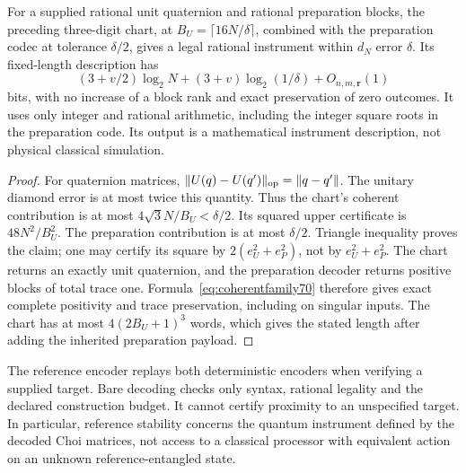 \begin{corollary}\label{cor:qubitcodec70}
For a supplied rational unit quaternion and rational preparation blocks,
the preceding three-digit chart, at $B_U=\lceil16N/\delta\rceil$, combined
with the preparation codec at tolerance $\delta/2$, gives a legal rational
instrument within $d_N$ error $\delta$. Its fixed-length description has
\[
 (3+v/2)\log_2N+(3+v)\log_2(1/\delta)+O_{n,m,\boldsymbol r}(1)
\]
bits, with no increase of a block rank and exact preservation of zero
outcomes. It uses only integer and rational arithmetic, including the
integer square roots in the preparation code. Its output is a mathematical
instrument description, not physical classical simulation.
\end{corollary}
\begin{proof}
For quaternion matrices,
$\|U(q)-U(q')\|_{\rm op}=\|q-q'\|$. The unitary diamond error is
at most twice this quantity. Thus the chart's coherent contribution
is at most $4\sqrt3 N/B_U<\delta/2$. Its squared upper certificate is
$48N^2/B_U^2$. The preparation contribution is at most $\delta/2$.
Triangle inequality proves the claim; one may certify its square by
$2(e_U^2+e_P^2)$, not by $e_U^2+e_P^2$. The chart returns an exactly
unit quaternion, and the preparation decoder returns positive blocks
of total trace one. Formula~\eqref{eq:coherentfamily70} therefore gives
exact complete positivity and trace preservation, including on singular
inputs. The chart has at most $4(2B_U+1)^3$ words, which gives the
stated length after adding the inherited preparation payload.
\end{proof}
The reference encoder replays both deterministic encoders when verifying
a supplied target. Bare decoding checks only syntax, rational legality and
the declared construction budget. It cannot certify proximity to an
unspecified target. In particular, reference stability concerns the quantum
instrument defined by the decoded Choi matrices, not access to a classical
processor with equivalent action on an unknown reference-entangled state.
